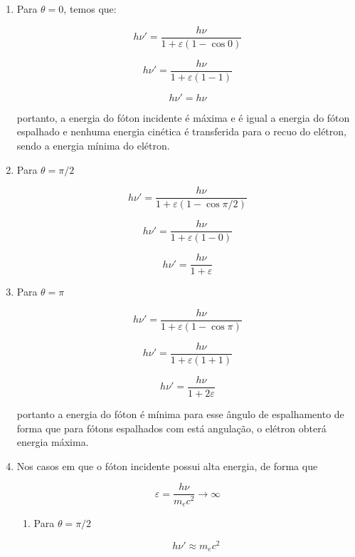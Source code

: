 \documentclass[11pt,a4paper]{article}
\begin{document}
    \begin{enumerate}
		\item Para $\theta = 0$, temos que:
		
			$$h\nu' = \frac{h\nu}{1 + \varepsilon (1 - \cos 0)}$$

			$$h\nu' = \frac{h\nu}{1 + \varepsilon (1 - 1)}$$

			\begin{equation}
				h\nu' = h\nu
			\end{equation}

			\noindent portanto, a energia do fóton incidente é máxima e é igual a energia do fóton espalhado e nenhuma energia cinética é transferida para o recuo do elétron, sendo a energia mínima do elétron.

		\item Para $\theta = \pi/2$
		
			$$h\nu' = \frac{h\nu}{1 + \varepsilon (1 - \cos \pi/2)}$$

			$$h\nu' = \frac{h\nu}{1 + \varepsilon (1 - 0)}$$

			\begin{equation}
				h\nu' = \frac{h\nu}{1 + \varepsilon}
			\end{equation}


		\item Para $\theta = \pi$
		
			$$h\nu' = \frac{h\nu}{1 + \varepsilon (1 - \cos \pi)}$$

			$$h\nu' = \frac{h\nu}{1 + \varepsilon (1 + 1)}$$

			\begin{equation}
				h\nu' = \frac{h\nu}{1 + 2\varepsilon}
			\end{equation}
			
			\noindent portanto a energia do fóton é mínima para esse ângulo de espalhamento de forma que para fótons espalhados com está angulação, o elétron obterá energia máxima.

		\item Nos casos em que o fóton incidente possui alta energia, de forma que
		
			$$\varepsilon = \frac{h\nu}{m_ec^2} \rightarrow \infty$$

		\noindent

			\begin{enumerate}
				\item Para $\theta = \pi/2$
				
					\begin{equation}
						h\nu' \approx m_ec^2
					\end{equation}


\end{enumerate}
\end{enumerate}
\end{document}

